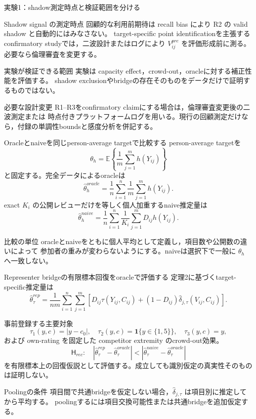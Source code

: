 \documentclass[aspectratio=169,10pt]{beamer}
\newcommand{\E}{\mathbb{E}}
\newcommand{\1}{\mathbf{1}}
\begin{document}
\begin{frame}{実験1：shadow測定時点と検証範囲を分ける}
\begin{alertblock}{Shadow signal の測定時点}
回顧的な利用前期待は recall bias により R2 の valid shadow と自動的にはみなさない。
target-specific point identificationを主張するconfirmatory studyでは，二波設計またはログにより
$V_{ij}^{pre}$ を評価形成前に測る。必要なら倫理審査を変更する。
\end{alertblock}
\begin{block}{実験が検証できる範囲}
実験は capacity effect，crowd-out，oracleに対する補正性能を評価する。
shadow exclusionやbridgeの存在そのものをデータだけで証明するものではない。
\end{block}
\begin{alertblock}{必要な設計変更}
R1--R3をconfirmatory claimにする場合は，倫理審査変更後の二波測定または
時点付きプラットフォームログを用いる。現行の回顧測定だけなら，付録の単調性boundsと感度分析を併記する。
\end{alertblock}
\end{frame}

\begin{frame}{Oracleとnaiveを同じperson-average targetで比較する}
person-average targetを
\[
\theta_h=\E\left\{\frac1m\sum_{j=1}^{m}h(Y_{ij})\right\}
\]
と固定する。完全データによるoracleは
\[
\widehat\theta_h^{oracle}
=\frac1n\sum_{i=1}^n\frac1m\sum_{j=1}^{m}h(Y_{ij}).
\]
exact $K_i$ の公開レビューだけを等しく個人加重するnaive推定量は
\[
\widehat\theta_h^{naive}
=\frac1n\sum_{i=1}^n\frac1{K_i}\sum_{j=1}^{m}D_{ij}h(Y_{ij}).
\]
\begin{alertblock}{比較の単位}
oracleとnaiveをともに個人平均として定義し，項目数や公開数の違いによって
参加者の重みが変わらないようにする。naiveは選択下で一般に $\theta_h$ へ一致しない。
\end{alertblock}
\end{frame}

\begin{frame}[shrink=10]{Representer bridgeの有限標本回復をoracleで評価する}
定理2に基づくtarget-specific推定量は
\[
\widehat\theta_{\tau}^{rep}
=\frac1{nm}\sum_{i=1}^n\sum_{j=1}^{m}
\left[
D_{ij}\tau(Y_{ij},C_{ij})
+(1-D_{ij})\widehat\delta_{j,\tau}(V_{ij},C_{ij})
\right].
\]
\begin{alertblock}{事前登録する主要対象}
\[
\tau_1(y,c)=|y-c_0|,
\quad \tau_2(y,c)=\1\{y\in\{1,5\}\},
\quad \tau_3(y,c)=y,
\]
および own-rating を固定した competitor extremity のcrowd-out効果。
\[
\mathsf H_{rec}:\quad
|\widehat\theta_{\tau}^{rep}-\widehat\theta_{\tau}^{oracle}|
<
|\widehat\theta_{\tau}^{naive}-\widehat\theta_{\tau}^{oracle}|
\]
を有限標本上の回復仮説として評価する。成立しても識別仮定の真実性そのものは証明しない。
\end{alertblock}
\begin{block}{Poolingの条件}
項目間で共通bridgeを仮定しない場合，$\widehat\delta_{j,\tau}$ は項目別に推定してから平均する。
poolingするには項目交換可能性または共通bridgeを追加仮定する。
\end{block}
\end{frame}
\end{document}
